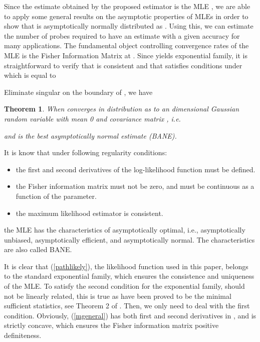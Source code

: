 \documentclass[10pt,twocolumn]{IEEEtran}
\newtheorem{theorem}{\hspace*{1pc}Theorem}
\begin{document}
Since the estimate obtained by the proposed estimator is the MLE , we are able to apply some general results on the asymptotic
properties of MLEs in order to show that  is asymptotically normally distributed as . Using this, we can estimate the number of probes required to
have an estimate with a given accuracy for many applications. The
fundamental object controlling convergence rates of the MLE is the
Fisher Information Matrix at . Since  yields
exponential family, it is straightforward to verify that  is consistent and that  satisfies conditions
under which  is equal to



\noindent Eliminate singular on the boundary of , we have
\begin{theorem}\label{asympototic theorem}
When  converges in distribution as  to an
 dimensional Gaussian random variable with mean 0 and covariance
matrix , i.e.


\noindent and  is the best asymptotically normal
estimate (BANE).
\end{theorem}


\begin{IEEEproof}
\noindent It is know that under following regularity conditions:
\begin{itemize}
\item the first and second derivatives of the log-likelihood function
must be defined.
\item the Fisher information matrix must not be zero, and must be
continuous as a function of the parameter.
\item the maximum likelihood estimator is consistent.
\end{itemize}
\noindent the MLE has the characteristics of asymptotically optimal,
i.e., asymptotically unbiased, asymptotically efficient, and
asymptotically normal. The characteristics are also called BANE.

It is clear that (\ref{pathlikely}), the likelihood function used in
this paper, belongs to the standard exponential family, which ensures
the consistence and uniqueness of the MLE. To satisfy  the second
condition for the exponential family, 
should not be linearly related, this is true as  have been proved to be the minimal sufficient statistics, see
Theorem 2 of \cite{ZD09}. Then, we only need to deal with the first
condition. Obviously, (\ref{mgeneral}) has both first and second
derivatives in , and  is strictly concave,
which ensures the Fisher information matrix  positive
definiteness.
\end{IEEEproof}
\end{document}
